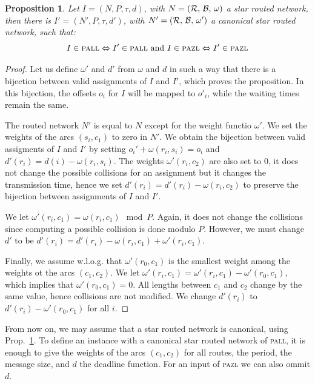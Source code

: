 \documentclass[a4paper,10pt]{article}
\newtheorem{proposition}{Proposition}
\newcommand\pazl{\textsc{pazl}\xspace}
\newcommand\pall{\textsc{pall}\xspace}
\begin{document}
  \begin{proposition}\label{prop:canonical}
   Let $I = (N, P, \tau , d)$, with $N = (\cal{R},\,\cal{B},\,\omega)$ a star routed network, then there is 
   $I' = (N', P, \tau , d')$, with  $N' = (\cal{R},\,\cal{B},\,\omega')$ a canonical star routed network, such that:
     $$I \in \pall \Leftrightarrow I' \in \pall \text{ and } I \in \pazl \Leftrightarrow I' \in \pazl$$
  \end{proposition}

  \begin{proof}
  Let us define $\omega'$ and $d'$ from $\omega$ and $d$ in such a way that there is a bijection 
   between valid assignments of $I$ and $I'$, which proves the proposition. In this bijection,
   the offsets $o_i$ for $I$ will be mapped to $o'_i$, while the waiting times remain the same.
  
  The routed network $N'$ is equal to $N$ except for the weight functio $\omega'$.
  We set the weights of the arcs $(s_i,c_1)$ to zero in $N'$. We obtain the bijection between valid assigments of $I$ and $I'$ by setting $o_i' + \omega(r_i,s_i) = o_i $ and $d'(r_i) = d(i) - \omega(r_i,s_i)$. The weights $\omega'(r_i,c_2)$ are also set to $0$, it does not change the possible collisions
  for an assignment but it changes the transmission time, hence we set $d'(r_i) = d'(r_i) - \omega(r_i,c_2)$
  to preserve the bijection between assignments of $I$ and $I'$. 

  We let $\omega'(r_i,c_1) = \omega(r_i,c_1) \mod P$. Again, it does not change the collisions since computing a possible collision is done modulo $P$. However, we must change $d'$ to be $d'(r_i) = d'(r_i) - \omega(r_i,c_1) + \omega'(r_i,c_1)$.

  Finally, we assume w.l.o.g. that $\omega'(r_0,c_1)$ is the smallest weight among the weights ot the arcs
  $(c_1,c_2)$. We let $\omega'(r_i,c_1) = \omega'(r_i,c_1) - \omega'(r_0,c_1)$, which implies that $\omega'(r_0,c_1) = 0$.  All lengths between $c_1$ and $c_2$ change by the same value, hence collisions are not modified. We change $d'(r_i)$ to  $d'(r_i) - \omega'(r_0,c_1)$ for all $i$.
  \end{proof}

   From now on, we may assume that a star routed network is canonical, using Prop.~\ref{prop:canonical}. To define an instance with a canonical star routed network of \pall, it is enough to give the weights of the arcs $(c_1,c_2)$ for all routes, the period, the message size, and $d$ the deadline function. For an input of \pazl we can also ommit $d$.
\end{document}
